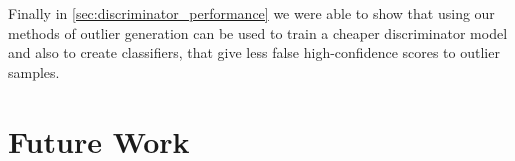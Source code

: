 Finally in \autoref{sec:discriminator_performance} we were able to show that
using our methods of outlier generation can be used to train a cheaper
discriminator model and also to create classifiers, that give less false
high-confidence scores to outlier samples.


\section{Future Work}%
\label{sec:future_work}


